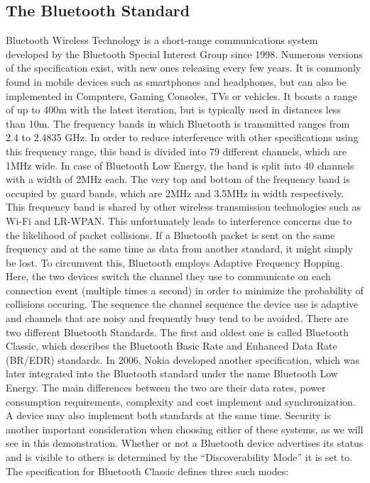 \begin{itemize}
\subsection{The Bluetooth Standard}
Bluetooth Wireless Technology is a short-range communications system developed by the Bluetooth Special Interest Group since 1998. Numerous versions of the specification exist, with new ones releasing every few years. It is commonly found in mobile devices such as smartphones and headphones, but can also be implemented in Computers, Gaming Consoles, TVs or vehicles.
It boasts a range of up to 400m with the latest iteration, but is typically used  in distances less than 10m. The frequency bands in which Bluetooth is transmitted ranges from 2.4 to 2.4835 GHz. In order to reduce interference with other specifications using this frequency range, this band is divided into 79 different channels, which are 1MHz wide. In case of Bluetooth Low Energy, the band is split into 40 channels with a width of 2MHz each. The very top and bottom of the frequency band is occupied by guard bands, which are 2MHz and 3.5MHz in width respectively.\cite{btspec}
This frequency band is shared by other wireless transmission technologies such as Wi-Fi and LR-WPAN. This unfortunately leads to interference concerns due to the likelihood of packet collisions. If a Bluetooth packet is sent on the same frequency and at the same time as data from another standard, it might simply be lost. To circumvent this, Bluetooth employs Adaptive Frequency Hopping. Here, the two devices switch the channel they use to communicate on each connection event (multiple times a second) in order to minimize the probability of collisions occuring. The sequence the channel sequence the device use is adaptive and channels that are noisy and frequently busy tend to be avoided.
\cite{adaptivefreq}
There are two different Bluetooth Standards. The first and oldest one is called Bluetooth Classic, which describes the Bluetooth Basic Rate and Enhanced Data Rate (BR/EDR) standards. In 2006, Nokia developed another specification, which was later integrated into the Bluetooth standard under the name Bluetooth Low Energy. The main differences between the two are their data rates, power consumption requirements, complexity and cost implement and synchronization. A device may also implement both standards at the same time. Security is another important consideration when choosing either of these systems, as we will see in this demonstration.
\cite{btspec}
Whether or not a Bluetooth device advertises its status and is visible to others is determined by the ``Discoverability Mode'' it is set to. The specification for Bluetooth Classic defines three such modes:

\end{itemize}
